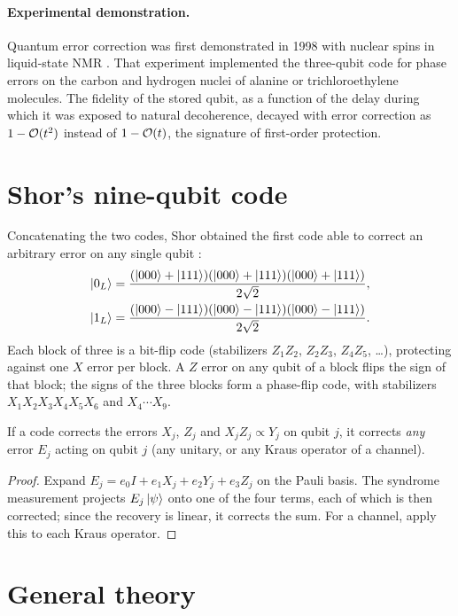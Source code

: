 \paragraph{Experimental demonstration.} Quantum error correction was first demonstrated in 1998 with nuclear spins in liquid-state NMR \cite{Cory1998}. That experiment implemented the three-qubit code for phase errors
on the carbon and hydrogen nuclei of alanine or trichloroethylene molecules. The fidelity of the stored qubit, as a function of the delay during which it was exposed to natural decoherence, decayed with error correction
as $1-\mathcal O(t^2)$ instead of $1-\mathcal O(t)$, the signature of first-order protection.

\section{Shor's nine-qubit code}
Concatenating the two codes, Shor obtained the first code able to correct an arbitrary error on any single qubit \cite{Shor1995}:
\begin{gather}
  \left|0_L\right\rangle=\frac{(\left|000\right\rangle+\left|111\right\rangle)(\left|000\right\rangle+\left|111\right\rangle)(\left|000\right\rangle+\left|111\right\rangle)}{2\sqrt2},\\
  \left|1_L\right\rangle=\frac{(\left|000\right\rangle-\left|111\right\rangle)(\left|000\right\rangle-\left|111\right\rangle)(\left|000\right\rangle-\left|111\right\rangle)}{2\sqrt2}.
\end{gather}
Each block of three is a bit-flip code (stabilizers $Z_1Z_2$, $Z_2Z_3$, $Z_4Z_5$, \dots), protecting against one $X$ error per block. A $Z$ error on any qubit of a block flips the sign of that block; the signs of the three
blocks form a phase-flip code, with stabilizers $X_1X_2X_3X_4X_5X_6$ and $X_4\cdots X_9$.
\begin{theorem}
If a code corrects the errors $X_j$, $Z_j$ and $X_jZ_j\propto Y_j$ on qubit $j$, it corrects \emph{any} error $E_j$ acting on qubit $j$ (any unitary, or any Kraus operator of a channel).
\end{theorem}
\begin{proof}
Expand $E_j=e_0I+e_1X_j+e_2Y_j+e_3Z_j$ on the Pauli basis. The syndrome measurement projects $E_j\left|\psi\right\rangle$ onto one of the four terms, each of which is then corrected; since the recovery is linear, it corrects the sum.
For a channel, apply this to each Kraus operator.
\end{proof}

\section{General theory\starred}
